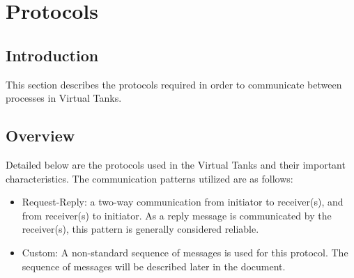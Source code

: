 \documentclass[12pt]{article}
\begin{document}
\section{Protocols}
	\subsection{Introduction}
		This section describes the protocols required in order to communicate between processes in Virtual Tanks.
	
	\subsection{Overview}
		Detailed below are the protocols used in the Virtual Tanks and their important characteristics. The communication patterns utilized are as follows:
		\begin{itemize}
			\item{Request-Reply: a two-way communication from initiator to receiver(s), and from receiver(s) to initiator. As a reply message is communicated by the receiver(s), this pattern is generally considered reliable.}
			\item{Custom: A non-standard sequence of messages is used for this protocol. The sequence of messages will be described later in the document.}
		\end{itemize}
		
\end{document}
